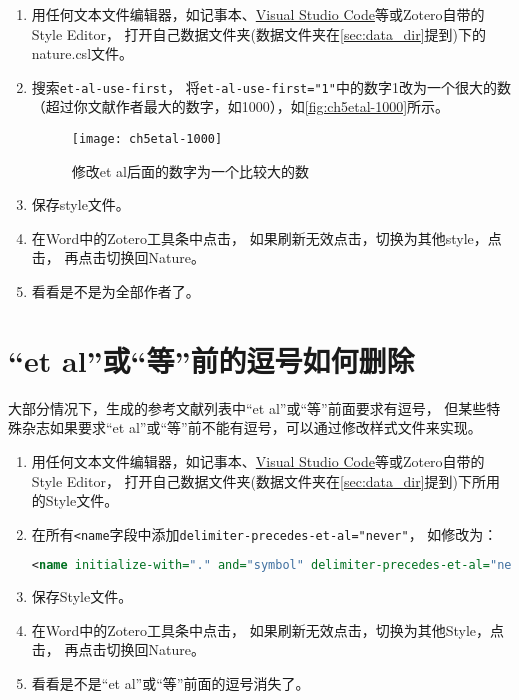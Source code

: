 \documentclass[theorem=false,mathfont=none,openany,sub3section]{easybook}
\begin{document}
{\begin{enumerate}
	\item 
	用任何文本文件编辑器，如记事本、\href{https://code.visualstudio.com/}{Visual Studio Code}等或Zotero自带的Style Editor，
	打开自己数据文件夹(数据文件夹在\cref{sec:data_dir}提到)下的nature.csl文件。
	\item 搜索\verb|et-al-use-first|，
	将\verb|et-al-use-first="1"|中的数字1改为一个很大的数
	（超过你文献作者最大的数字，如1000），如\autoref{fig:ch5etal-1000}所示。
	\begin{figure}[ht]
		\centering
		\texttt{[image: ch5etal-1000]}
		\caption{修改et al后面的数字为一个比较大的数}
		\label{fig:ch5etal-1000}
	\end{figure}
	\item 保存style文件。
	\item 在Word中的Zotero工具条中点击，
	如果刷新无效点击，切换为其他style，点击，
	再点击切换回Nature。
	\item 看看是不是为全部作者了。
\end{enumerate}

\section{“et al”或“等”前的逗号如何删除}\label{sec:comma-before-et-al}

大部分情况下，生成的参考文献列表中“et al”或“等”前面要求有逗号，
但某些特殊杂志如果要求“et al”或“等”前不能有逗号，可以通过修改样式文件来实现。
\begin{enumerate}
	\item 
	用任何文本文件编辑器，如记事本、\href{https://code.visualstudio.com/}{Visual Studio Code}等或Zotero自带的Style Editor，
	打开自己数据文件夹(数据文件夹在\cref{sec:data_dir}提到)下所用的Style文件。
	\item 在所有\verb|<name|字段中添加\verb|delimiter-precedes-et-al="never"|，
	如修改为：	
	
	\begin{lstlisting}[language=XML]
		<name initialize-with="." and="symbol" delimiter-precedes-et-al="never">
	\end{lstlisting}
	
	\item 保存Style文件。
	\item 在Word中的Zotero工具条中点击，
	如果刷新无效点击，切换为其他Style，点击，
	再点击切换回Nature。
	\item 看看是不是“et al”或“等”前面的逗号消失了。
	

\end{enumerate}}
\end{document}
